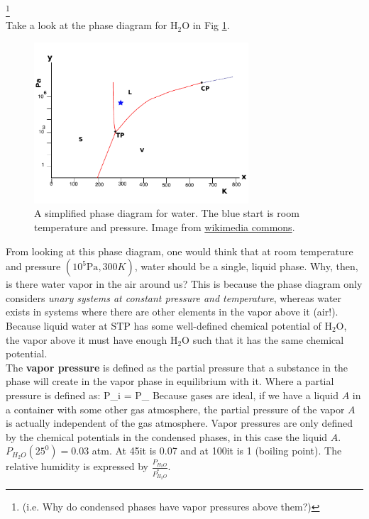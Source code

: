 \documentclass[12pt]{article}
\begin{document}
\footnote{(i.e. Why do condensed phases have vapor pressures above them?)}\\
Take a look at the phase diagram for $\text{H}_2\text{O}$ in Fig \ref{PDH2O}.
\begin{figure}[h]
\centering
\includegraphics[width=8cm]{Water_phase_diagram}
\caption{A simplified phase diagram for water. The blue start is room temperature and pressure. Image from \href{https://commons.wikimedia.org/wiki/File:Water_phase_diagram.svg}{wikimedia commons}.}
\label{PDH2O}
\end{figure}
From looking at this phase diagram, one would think that at room temperature and pressure $\left(10^5\text{Pa}, 300 K\right)$, water should be
a single, liquid phase. Why, then, is there water vapor in the air around us? This is because the phase diagram only considers \textit{unary
systems at constant pressure and temperature}, whereas water exists in systems where there are other elements in the vapor above it (air!). Because liquid water at STP has some well-defined chemical potential of $\text{H}_2\text{O}$, the vapor above it must have enough $\text{H}_2\text{O}$ such that it has the same chemical potential.\\

The \textbf{vapor pressure} is defined as the partial pressure that a substance in the  phase will create in the vapor phase in equilibrium with it. Where a partial pressure is defined as:
\eqs
P_i =  P_
\eqe
Because gases are ideal, if we have a liquid $A$ in a container with some other gas atmosphere, the partial pressure of the vapor $A$ is actually independent of the gas atmosphere. Vapor pressures are only defined by the chemical potentials in the condensed phases, in this case the liquid $A$.\\

 $P_{H_2O}(25^0) = 0.03$ atm.  At 45\degree it is 0.07 and at 100\degree it is 1 (boiling point).  The relative humidity is expressed by $\frac{P_{H_2O}}{P_{H_2O}^*}$.
\end{document}
